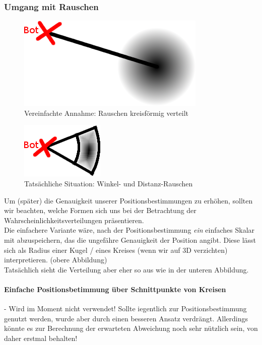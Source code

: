 \subsubsection{Umgang mit Rauschen}
\begin{figure}[h]
\begin{center}
\includegraphics[scale=0.6]{MPGI3-RC-13S_Wahrscheinlichkeit2}
\end{center}
\caption{Vereinfachte Annahme: Rauschen kreisförmig verteilt}
\end{figure}
\begin{figure}[h]
\begin{center}
\includegraphics[scale=0.6]{MPGI3-RC-13S_Wahrscheinlichkeit1}
\end{center}
\caption{Tatsächliche Situation: Winkel- und Distanz-Rauschen}
\end{figure}
Um (später) die Genauigkeit unserer Positionsbestimmungen zu erhöhen,
 sollten wir beachten, welche Formen sich uns bei der Betrachtung der 
Wahrscheinlichkeitsverteilungen präsentieren.\\
Die einfachere Variante wäre, nach der Positionsbestimmung \textit{ein}
 einfaches Skalar mit abzuspeichern, das die ungefähre Genauigkeit der 
Position angibt. Diese lässt sich als Radius einer Kugel / eines Kreises
 (wenn wir auf 3D verzichten) interpretieren. (obere Abbildung)\\
Tatsächlich sieht die Verteilung aber eher so aus wie in der unteren Abbildung.

\paragraph{Einfache Positionsbetimmung über Schnittpunkte von Kreisen}
- Wird im Moment nicht verwendet! Sollte iegentlich zur 
Positionsbestimmung genutzt werden, wurde aber durch einen besseren 
Ansatz verdrängt.
Allerdings könnte es zur Berechnung der erwarteten Abweichung noch sehr 
nützlich sein, von daher erstmal behalten!

